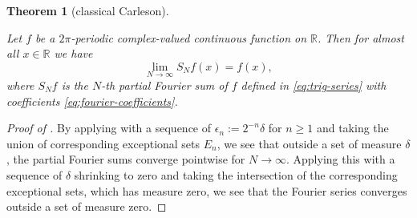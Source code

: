 \documentclass[10pt,a4paper]{article}
\theoremstyle{plain}
\newtheorem{theorem}{Theorem}[subsection]
\theoremstyle{definition}
\numberwithin{equation}{subsection}
\newcommand{\lean}[1]{}
\newcommand{\proves}[1]{}
\newcommand{\uses}[1]{}
\newcommand{\leanok}{}
\begin{document}
\begin{theorem}[classical Carleson]
    \label{classical-carleson}
    \leanok
    \lean{classical_carleson}
    \uses{exceptional-set-carleson}
    Let $f$ be a $2\pi$-periodic complex-valued continuous function on $\mathbb{R}$.
    Then for almost all $x \in \mathbb{R}$ we have
    \begin{equation}\label{eq:fourier-limit}
      \lim_{N\to\infty}S_N f(x) = f(x),
    \end{equation}
    where $S_N f$ is the $N$-th partial Fourier sum of $f$ defined in \eqref{eq:trig-series}
    with coefficients \eqref{eq:fourier-coefficients}.
\end{theorem}

\begin{proof}[Proof of ]
\proves{classical-carleson}
\leanok
By applying  with a sequence of $\epsilon_n:= 2^{-n}\delta$ for $n\ge 1$ and taking the union
of corresponding exceptional sets $E_n$, we see that outside a set of measure $\delta$, the partial Fourier
sums converge pointwise for $N\to \infty$. Applying this with a sequence of $\delta$ shrinking to zero and
taking the intersection of the corresponding exceptional sets, which has measure zero, we see that the Fourier
series converges outside a set of measure zero.
\end{proof}



\end{document}

